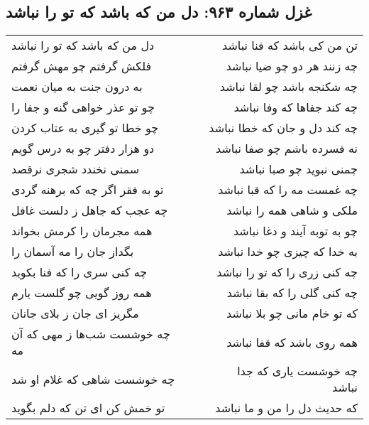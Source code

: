 \begin{center}
\section*{غزل شماره ۹۶۳: دل من که باشد که تو را نباشد}
\label{sec:0963}
\begin{longtable}{l p{0.5cm} r}
دل من که باشد که تو را نباشد
&&
تن من کی باشد که فنا نباشد
\\
فلکش گرفتم چو مهش گرفتم
&&
چه زنند هر دو چو ضیا نباشد
\\
به درون جنت به میان نعمت
&&
چه شکنجه باشد چو لقا نباشد
\\
چو تو عذر خواهی گنه و جفا را
&&
چه کند جفاها که وفا نباشد
\\
چو خطا تو گیری به عتاب کردن
&&
چه کند دل و جان که خطا نباشد
\\
دو هزار دفتر چو به درس گویم
&&
نه فسرده باشم چو صفا نباشد
\\
سمنی نخندد شجری نرقصد
&&
چمنی نبوید چو صبا نباشد
\\
تو به فقر اگر چه که برهنه گردی
&&
چه غمست مه را که قبا نباشد
\\
چه عجب که جاهل ز دلست غافل
&&
ملکی و شاهی همه را نباشد
\\
همه مجرمان را کرمش بخواند
&&
چو به توبه آیند و دغا نباشد
\\
بگداز جان را مه آسمان را
&&
به خدا که چیزی چو خدا نباشد
\\
چه کنی سری را که فنا بکوبد
&&
چه کنی زری را که تو را نباشد
\\
همه روز گویی چو گلست یارم
&&
چه کنی گلی را که بقا نباشد
\\
مگریز ای جان ز بلای جانان
&&
که تو خام مانی چو بلا نباشد
\\
چه خوشست شب‌ها ز مهی که آن مه
&&
همه روی باشد که قفا نباشد
\\
چه خوشست شاهی که غلام او شد
&&
چه خوشست یاری که جدا نباشد
\\
تو خمش کن ای تن که دلم بگوید
&&
که حدیث دل را من و ما نباشد
\\
\end{longtable}
\end{center}
